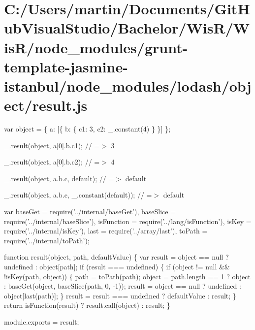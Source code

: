\hypertarget{_c_1_2_users_2martin_2_documents_2_git_hub_visual_studio_2_bachelor_2_wis_r_2_wis_r_2node_module9b36999384d934418c265def52fa8f7b}{}\section{C\+:/\+Users/martin/\+Documents/\+Git\+Hub\+Visual\+Studio/\+Bachelor/\+Wis\+R/\+Wis\+R/node\+\_\+modules/grunt-\/template-\/jasmine-\/istanbul/node\+\_\+modules/lodash/object/result.\+js}
var object = \{ \textquotesingle{}a\textquotesingle{}\+: \mbox{[}\{ \textquotesingle{}b\textquotesingle{}\+: \{ \textquotesingle{}c1\textquotesingle{}\+: 3, \textquotesingle{}c2\textquotesingle{}\+: \+\_\+.\+constant(4) \} \}\mbox{]} \};

\+\_\+.\+result(object, \textquotesingle{}a\mbox{[}0\mbox{]}.b.\+c1\textquotesingle{}); // =$>$ 3

\+\_\+.\+result(object, \textquotesingle{}a\mbox{[}0\mbox{]}.b.\+c2\textquotesingle{}); // =$>$ 4

\+\_\+.\+result(object, \textquotesingle{}a.\+b.\+c\textquotesingle{}, \textquotesingle{}default\textquotesingle{}); // =$>$ \textquotesingle{}default\textquotesingle{}

\+\_\+.\+result(object, \textquotesingle{}a.\+b.\+c\textquotesingle{}, \+\_\+.\+constant(\textquotesingle{}default\textquotesingle{})); // =$>$ \textquotesingle{}default\textquotesingle{}


\begin{DoxyCodeInclude}
var baseGet = require(\textcolor{stringliteral}{'../internal/baseGet'}),
    baseSlice = require(\textcolor{stringliteral}{'../internal/baseSlice'}),
    isFunction = require(\textcolor{stringliteral}{'../lang/isFunction'}),
    isKey = require(\textcolor{stringliteral}{'../internal/isKey'}),
    last = require(\textcolor{stringliteral}{'../array/last'}),
    toPath = require(\textcolor{stringliteral}{'../internal/toPath'});

\textcolor{keyword}{function} result(\textcolor{keywordtype}{object}, path, defaultValue) \{
  var result = \textcolor{keywordtype}{object} == null ? undefined : \textcolor{keywordtype}{object}[path];
  \textcolor{keywordflow}{if} (result === undefined) \{
    \textcolor{keywordflow}{if} (\textcolor{keywordtype}{object} != null && !isKey(path, \textcolor{keywordtype}{object})) \{
      path = toPath(path);
      \textcolor{keywordtype}{object} = path.length == 1 ? \textcolor{keywordtype}{object} : baseGet(\textcolor{keywordtype}{object}, baseSlice(path, 0, -1));
      result = \textcolor{keywordtype}{object} == null ? undefined : \textcolor{keywordtype}{object}[last(path)];
    \}
    result = result === undefined ? defaultValue : result;
  \}
  \textcolor{keywordflow}{return} isFunction(result) ? result.call(\textcolor{keywordtype}{object}) : result;
\}

module.exports = result;
\end{DoxyCodeInclude}
 